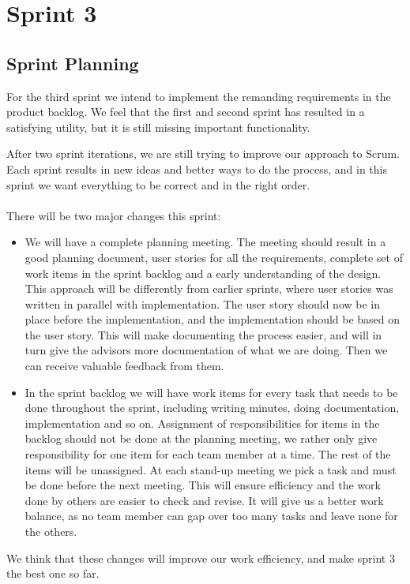 \chapter{Sprint 3}


\section{Sprint Planning}
For the third sprint we intend to implement the remanding requirements in the product backlog. We feel that the first and second sprint has resulted in a satisfying utility, but it is still missing important functionality.

After two sprint iterations, we are still trying to improve our approach to Scrum. Each sprint results in new ideas and better ways to do the process, and in this sprint we want everything to be correct and in the right order.\\
\\
There will be two major changes this sprint:
\begin {itemize}
\item We will have a complete planning meeting. The meeting should result in a good planning document, user stories for all the requirements, complete set of work items in the sprint backlog and a early understanding of the design. This approach will be differently from earlier sprints, where user stories was written in parallel with implementation. The user story should now be in place before the implementation, and the implementation should be based on the user story. This will make documenting the process easier, and will in turn give the advisors more documentation of what we are doing. Then we can receive valuable feedback from them.

\item In the sprint backlog we will have work items for every task that needs to be done throughout the sprint, including writing minutes, doing documentation, implementation and so on.  Assignment of responsibilities for items in the backlog should not be done at the planning meeting, we rather only give responsibility for one item for each team member at a time. The rest of the items will be unassigned. At each stand-up meeting we pick a task and must be done before the next meeting. This will ensure efficiency and the work done by others are easier to check and revise. It will give us a better work balance, as no team member can gap over too many tasks and leave none for the others.
\end{itemize}
We think that these changes will improve our work efficiency, and make sprint 3 the best one so far.


